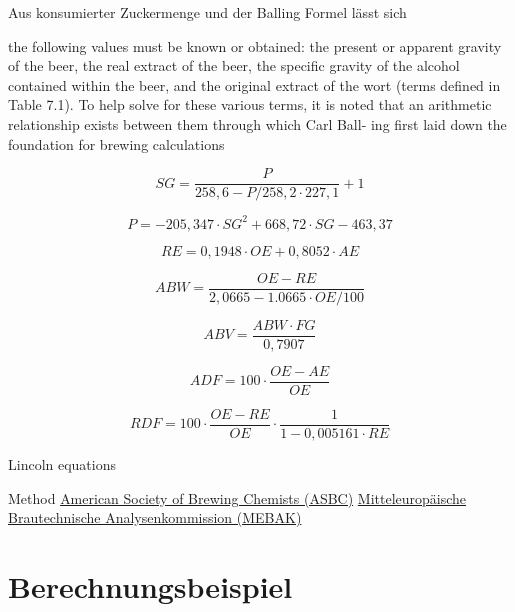 \documentclass[a4paper,parskip=half]{scrartcl}
\newcommand{\sg}{\mathit{SG}}
\newcommand{\fg}{\mathit{FG}}
\newcommand{\abv}{\mathit{ABV}}
\newcommand{\abw}{\mathit{ABW}}
\newcommand{\oex}{\mathit{OE}}
\newcommand{\aex}{\mathit{AE}}
\newcommand{\rex}{\mathit{RE}}
\newcommand{\adf}{\mathit{ADF}}
\newcommand{\rdf}{\mathit{RDF}}
\begin{document}
Aus konsumierter Zuckermenge und der Balling Formel lässt sich

the following values must be known or
obtained: the present or apparent gravity of the beer, the real extract of the beer,
the specific gravity of the alcohol contained within the beer, and the original extract
of the wort (terms defined in Table 7.1). To help solve for these various terms, it is
noted that an arithmetic relationship exists between them through which Carl Ball-
ing first laid down the foundation for brewing calculations

\begin{equation}
\sg = \frac{P}{258,6 - \mathit{P} / 258,2 \cdot 227,1} + 1
\end{equation}

\begin{equation}
P = -205,347 \cdot \sg^2 + 668,72 \cdot \sg - 463,37
\end{equation}

\begin{equation}
\rex = 0,1948 \cdot \oex + 0,8052 \cdot \aex
\end{equation}

\begin{equation}
\abw = \frac{\oex - \rex}{2,0665 - 1.0665 \cdot \oex / 100}
\end{equation}

\begin{equation}
\abv = \frac{\abw \cdot \fg}{0,7907}
\end{equation}

\autocite{Spedding2016}

\begin{equation}
\adf = 100 \cdot \frac{\oex - \aex}{\oex}
\end{equation}

\setlength{\jot}{2mm}

\begin{equation}
\rdf = 100 \cdot \frac{\oex - \rex}{\oex} \cdot \frac{1}{1 - 0,005161 \cdot \rex}
\end{equation}

\autocite{Speers2015}

Lincoln equations
\autocite{Spedding2016}

Method \href{https://www.asbcnet.org}{American Society of Brewing Chemists (ASBC)} \href{https://www.mebak.org}{Mitteleuropäische Brautechnische Analysenkommission (MEBAK)}

\section*{Berechnungsbeispiel}
\end{document}
